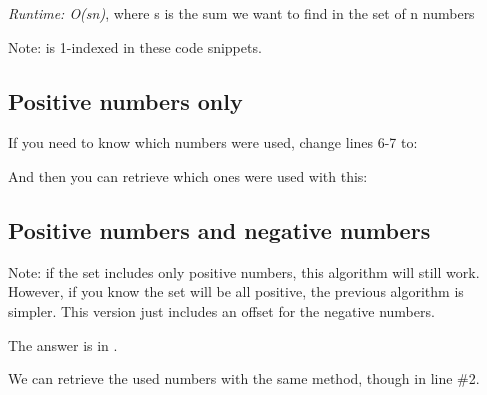 
\textit{Runtime: O(sn)}, where s is the sum we want to find in the set of n numbers

Note:  is 1-indexed in these code snippets.

\subsection*{Positive numbers only}



If you need to know which numbers were used, change lines 6-7 to:



And then you can retrieve which ones were used with this:



\subsection*{Positive numbers and negative numbers}

Note: if the set includes only positive numbers, this algorithm will still work. However, if you know the set will be all positive, the previous algorithm is simpler. This version just includes an offset for the negative numbers.



The answer is in .

We can retrieve the used numbers with the same method, though  in line \#2.

\newpage